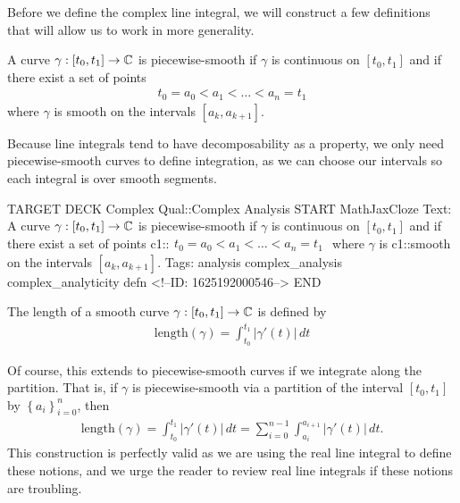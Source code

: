 \documentclass{memoir}
\begin{document}
Before we define the complex line integral, we will construct a few definitions that will allow us to work in more generality.
\begin{defn}
	A curve \(\gamma :[t_0,t_1]\to \mathbb{C}\) is piecewise-smooth if \(\gamma \) is continuous on \([t_0,t_1]\) and if there exist a set of points
	\begin{align*}
		t_0 = a_0<a_1<\ldots<a_n = t_1
	\end{align*}
	where \(\gamma \) is smooth on the intervals \([a_k,a_{k+1}]\).
\end{defn}
Because line integrals tend to have decomposability as a property, we only need piecewise-smooth curves to define integration, as we can choose our intervals so each integral is over smooth segments.

\begin{anki}
TARGET DECK
Complex Qual::Complex Analysis
START
MathJaxCloze
Text: A curve \(\gamma :[t_0,t_1]\to \mathbb{C}\) is piecewise-smooth if \(\gamma \) is continuous on \([t_0,t_1]\) and if there exist a set of points
 {{c1::\(\begin{align*}
         	t_0 = a_0<a_1<\ldots<a_n = t_1
         \end{align*}\)}}
where \(\gamma \) is {{c1::smooth on the intervals \([a_k,a_{k+1}]\)}}.
Tags: analysis complex_analysis complex_analyticity defn
<!--ID: 1625192000546-->
END
\end{anki}

\begin{defn}[Length]
	The length of a smooth curve \(\gamma:[t_0,t_1]\to \mathbb{C}\) is defined by
	\begin{align*}
		\textrm{length}(\gamma) = \int_{t_0}^{t_1} \left| \gamma '(t) \right| \,d t 
	\end{align*}
\end{defn}
Of course, this extends to piecewise-smooth curves if we integrate along the partition. That is, if \(\gamma \) is piecewise-smooth via a partition of the interval \([t_0,t_1]\) by \(\left\{ a_i \right\}_{i=0}^{n}\), then
\begin{align*}
	\textrm{length}(\gamma ) = \int_{t_0}^{t_1} \left| \gamma'(t) \right| \,d t = \sum_{i=0}^{n-1} \int_{a_i}^{a_{i+1}} \left| \gamma'(t) \right| \,d t.
\end{align*}
This construction is perfectly valid as we are using the real line integral to define these notions, and we urge the reader to review real line integrals if these notions are troubling.\\
\end{document}
